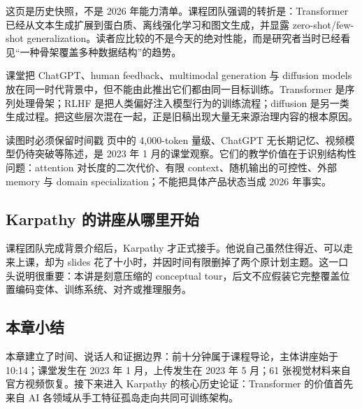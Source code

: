 这页是历史快照，不是 2026 年能力清单。课程团队强调的转折是：Transformer 已经从文本生成扩展到蛋白质、离线强化学习和图文生成，并显露 zero-shot/few-shot generalization。读者应比较的不是今天的绝对性能，而是研究者当时已经看见“一种骨架覆盖多种数据结构”的趋势。


课堂把 ChatGPT、human feedback、multimodal generation 与 diffusion models 放在同一时代背景中，但不能由此推出它们都由同一目标训练。Transformer 是序列处理骨架；RLHF 是把人类偏好注入模型行为的训练流程；diffusion 是另一类生成过程。把这些层次混在一起，正是旧稿出现大量无来源治理内容的根本原因。


\begin{warningbox}{读图时必须保留时间戳}
页中的 4,000-token 量级、ChatGPT 无长期记忆、视频模型仍待突破等陈述，是 2023 年 1 月的课堂观察。它们的教学价值在于识别结构性问题：attention 对长度的二次代价、有限 context、随机输出的可控性、外部 memory 与 domain specialization；不能把具体产品状态当成 2026 年事实。
\end{warningbox}

\subsection{Karpathy 的讲座从哪里开始}

课程团队完成背景介绍后，Karpathy 才正式接手。他说自己虽然住得近、可以走来上课，却为 slides 花了十小时，并因时间有限删掉了两个原计划主题。这一口头说明很重要：本讲是刻意压缩的 conceptual tour，后文不应假装它完整覆盖位置编码变体、训练系统、对齐或推理服务。



\subsection{本章小结}

本章建立了时间、说话人和证据边界：前十分钟属于课程导论，主体讲座始于 10:14；课堂发生在 2023 年 1 月，上传发生在 2023 年 5 月；61 张视觉材料来自官方视频恢复。接下来进入 Karpathy 的核心历史论证：Transformer 的价值首先来自 AI 各领域从手工特征孤岛走向共同可训练架构。

